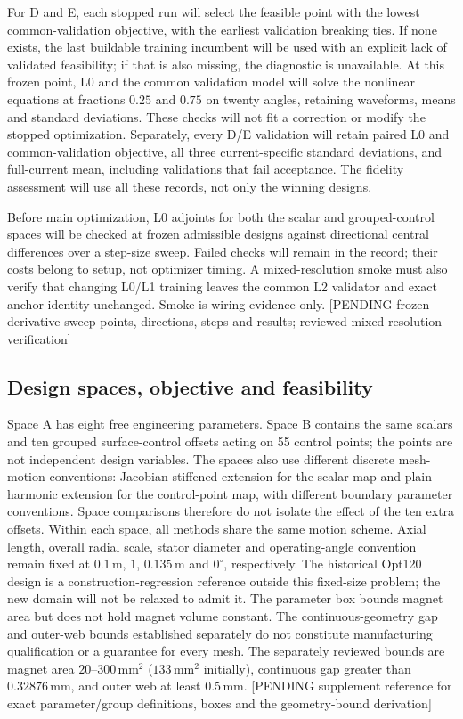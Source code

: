 For D and E, each stopped run will select the feasible point with the lowest
common-validation objective, with the earliest validation breaking ties. If none exists,
the last buildable training incumbent will be used with an explicit lack of
validated feasibility; if that is also missing, the diagnostic is unavailable.
At this frozen point, L0 and the common validation model will solve the
nonlinear equations at fractions $0.25$ and $0.75$ on twenty angles, retaining
waveforms, means and standard deviations. These checks will not fit a correction
or modify the stopped optimization. Separately, every D/E validation will
retain paired L0 and common-validation objective, all three current-specific
standard deviations, and full-current mean, including validations that fail
acceptance. The fidelity assessment will use all these records, not only the
winning designs.

Before main optimization, L0 adjoints for both the scalar and grouped-control
spaces will be checked at frozen admissible designs against directional
central differences over a step-size sweep. Failed checks will remain in the
record; their costs belong to setup, not optimizer timing. A mixed-resolution
smoke must also verify that changing L0/L1 training leaves the common L2
validator and exact anchor identity unchanged. Smoke is wiring evidence only.
[PENDING frozen derivative-sweep points, directions, steps and results;
reviewed mixed-resolution verification]

\subsection{Design spaces, objective and feasibility}

Space A has eight free engineering parameters. Space B contains the same
scalars and ten grouped surface-control offsets acting on 55 control points;
the points are not independent design variables. The spaces also use different
discrete mesh-motion conventions: Jacobian-stiffened extension for the scalar
map and plain harmonic extension for the control-point map, with different
boundary parameter conventions. Space comparisons therefore do not isolate
the effect of the ten extra offsets. Within each space, all methods share
the same motion scheme. Axial length, overall radial
scale, stator diameter and operating-angle convention remain fixed at
$0.1\,\mathrm{m}$, $1$, $0.135\,\mathrm{m}$ and $0^\circ$, respectively.
The historical Opt120 design is a construction-regression reference outside
this fixed-size problem; the new domain will not be relaxed to admit it. The
parameter box bounds magnet area but does not hold magnet volume constant.
The continuous-geometry gap and outer-web bounds established separately do
not constitute manufacturing qualification or a guarantee for every mesh.
The separately reviewed bounds are magnet area $20$--$300\,\mathrm{mm}^2$
($133\,\mathrm{mm}^2$ initially), continuous gap greater than
$0.32876\,\mathrm{mm}$, and outer web at least $0.5\,\mathrm{mm}$.
[PENDING supplement reference for exact parameter/group definitions,
boxes and the geometry-bound derivation]

